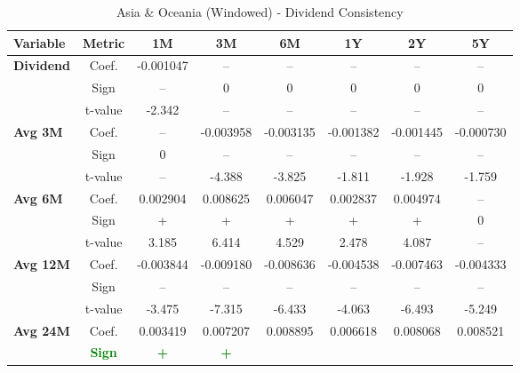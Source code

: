 \documentclass[11pt,english,a4paper,hidelinks]{book}
\begin{document}
\begin{table}[H]
    \centering
    \caption{Asia \& Oceania (Windowed) - Dividend Consistency}
    \begin{tabular}{lccccccc}
        \toprule
        \textbf{Variable} & \textbf{Metric} & \textbf{1M} & \textbf{3M} & \textbf{6M} & \textbf{1Y} & \textbf{2Y} & \textbf{5Y} \\
        \midrule
        \multirow{3}{*}{\textbf{Dividend}}
            & Coef.   & -0.001047 & --        & --        & --        & --        & --        \\
            & Sign    & –         & 0         & 0         & 0         & 0         & 0         \\
            & t-value & -2.342    & --        & --        & --        & --        & --        \\
        \cmidrule{1-8}
        \multirow{3}{*}{\textbf{Avg 3M}}
            & Coef.   & --        & -0.003958 & -0.003135 & -0.001382 & -0.001445 & -0.000730 \\
            & Sign    & 0         & –         & –         & –         & –         & –         \\
            & t-value & --        & -4.388    & -3.825    & -1.811    & -1.928    & -1.759    \\
        \cmidrule{1-8}
        \multirow{3}{*}{\textbf{Avg 6M}}
            & Coef.   & 0.002904  & 0.008625  & 0.006047  & 0.002837  & 0.004974  & --        \\
            & Sign    & +         & +         & +         & +         & +         & 0         \\
            & t-value & 3.185     & 6.414     & 4.529     & 2.478     & 4.087     & --        \\
        \cmidrule{1-8}
        \multirow{3}{*}{\textbf{Avg 12M}}
            & Coef.   & -0.003844 & -0.009180 & -0.008636 & -0.004538 & -0.007463 & -0.004333 \\
            & Sign    & –         & –         & –         & –         & –         & –         \\
            & t-value & -3.475    & -7.315    & -6.433    & -4.063    & -6.493    & -5.249    \\
        \cmidrule{1-8}
        \multirow{3}{*}{\textbf{Avg 24M}}
            & Coef.   & 0.003419  & 0.007207  & 0.008895  & 0.006618  & 0.008068  & 0.008521  \\
            & \textbf{\textcolor{green}{Sign}}
                     & \textbf{\textcolor{green}{+}}
                     & \textbf{\textcolor{green}{+}}

\end{tabular}
\end{table}
\end{document}
